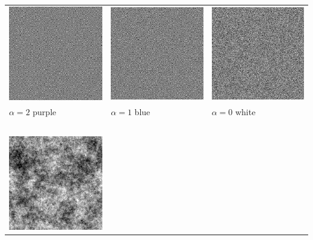\begin{tabular}{lll}
	\includegraphics{purple.png} &
	\includegraphics{blue.png} &
	\includegraphics{white2.png} \\
	$\alpha=2$ purple &
	$\alpha=1$ blue &
	$\alpha=0$ white \\
	$\phantom{a}$ &&\\
	\includegraphics{pink.png} &

\end{tabular}
